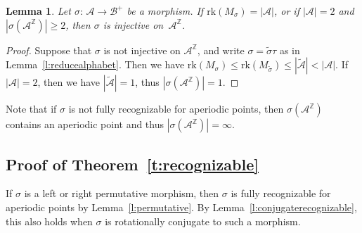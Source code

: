 \documentclass{amsart}
\newtheorem{lemma}{Lemma}[section]
\theoremstyle{definition}
\theoremstyle{remark}
\numberwithin{equation}{section}
\begin{document}
\begin{lemma} \label{l:injectiveinvertible}
Let $\sigma:\, \mathcal{A} \to \mathcal{B}^+$ be a morphism.
If $\mathrm{rk}(M_\sigma) = |\mathcal{A}|$, or if $|\mathcal{A}| = 2$ and $|\sigma(\mathcal{A}^\mathbb{Z})| \ge 2$, then $\sigma$ is injective on~$\mathcal{A}^\mathbb{Z}$. 
\end{lemma}

\begin{proof}
Suppose that $\sigma$ is not injective on $\mathcal{A}^\mathbb{Z}$, and write $\sigma = \tilde{\sigma} \tau$ as in Lemma~\ref{l:reducealphabet}.
Then we have $\mathrm{rk}(M_\sigma) \le \mathrm{rk}(M_{\tilde{\sigma}}) \le |\tilde{\mathcal{A}}| < |\mathcal{A}|$. 
If $|\mathcal{A}| = 2$, then we have $|\tilde{\mathcal{A}}| = 1$, thus $|\sigma(\mathcal{A}^\mathbb{Z})| = 1$.
\end{proof}

Note that if $\sigma$ is not fully recognizable for aperiodic points, then $\sigma(\mathcal{A}^\mathbb{Z})$ contains an aperiodic point and thus $|\sigma(\mathcal{A}^\mathbb{Z})| = \infty$.

\subsection{Proof of Theorem~\ref{t:recognizable}} \label{sec:proof-theor-reft:r}
If $\sigma$ is a left or right permutative morphism, then $\sigma$ is fully recognizable for aperiodic points by Lemma~\ref{l:permutative}. 
By Lemma~\ref{l:conjugaterecognizable}, this also holds when $\sigma$ is rotationally conjugate to such a morphism.
\end{document}

